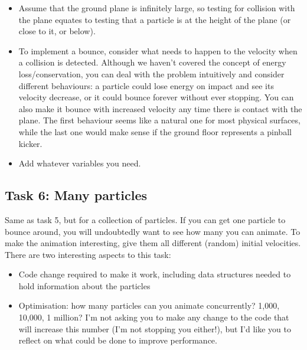 \documentclass[12pt]{article}
\begin{document}
\begin{itemize}
\item Assume that the ground plane is infinitely large, so testing for collision with the plane equates to testing that a particle is at the height of the plane (or close to it, or below). 
\item To implement a bounce, consider what needs to happen to the velocity when a collision is detected. Although we haven't covered the concept of energy loss/conservation, you can deal with the problem intuitively and consider different behaviours: a particle could lose energy on impact and see its velocity decrease, or it could bounce forever without ever stopping. You can also make it bounce with increased velocity any time there is contact with the plane. The first behaviour seems like a natural one for most physical surfaces, while the last one would make sense if the ground floor represents a pinball kicker.
\item Add whatever variables you need.
\end{itemize}

\subsection*{Task 6: Many particles}

Same as task 5, but for a collection of particles. If you can get one particle to bounce around, you will undoubtedly want to see how many you can animate. To make the animation interesting, give them all different (random) initial velocities. There are two interesting aspects to this task: 

\begin{itemize}
\item Code change required to make it work, including data structures needed to hold information about the particles
\item Optimisation: how many particles can you animate concurrently? 1,000, 10,000, 1 million? I’m not asking you to make any change to the code that will increase this number (I'm not stopping you either!), but I’d like you to reflect on what could be done to improve performance.
\end{itemize}


\end{document}

